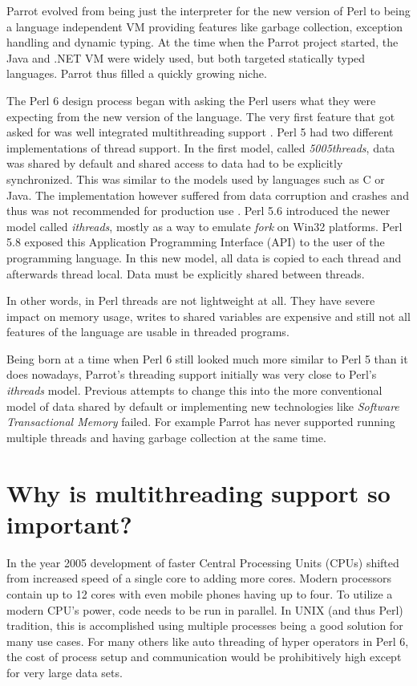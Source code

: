\documentclass[bachelor,english]{hgbthesis}
\begin{document}
Parrot evolved from being just the interpreter for the new version of Perl to being a language independent VM providing features like garbage collection, exception handling and dynamic typing. At the time when the Parrot project started, the Java and .NET VM were widely used, but both targeted statically typed languages. Parrot thus filled a quickly growing niche.

The Perl 6 design process began with asking the Perl users what they were expecting from the new version of the language. The very first feature that got asked for was well integrated multithreading support \cite{RFC1}. Perl 5 had two different implementations of thread support. In the first model, called \textit{5005threads}, data was shared by default and shared access to data had to be explicitly synchronized. This was similar to the models used by languages such as C or Java. The implementation however suffered from data corruption and crashes and thus was not recommended for production use \cite{ThreadManual}. Perl 5.6 introduced the newer model called \textit{ithreads}, mostly as a way to emulate \textit{fork} on Win32 platforms. Perl 5.8 exposed this Application Programming Interface (API) to the user of the programming language. In this new model, all data is copied to each thread and afterwards thread local. Data must be explicitly shared between threads.

In other words, in Perl threads are not lightweight at all. They have severe impact on memory usage, writes to shared variables are expensive and still not all features of the language are usable in threaded programs.

Being born at a time when Perl 6 still looked much more similar to Perl 5 than it does nowadays, Parrot's threading support initially was very close to Perl's \textit{ithreads} model. Previous attempts to change this into the more conventional model of data shared by default or implementing new technologies like \textit{Software Transactional Memory} failed. For example Parrot has never supported running multiple threads and having garbage collection at the same time.

\section{Why is multithreading support so important?}

In the year 2005 development of faster Central Processing Units (CPUs) shifted from increased speed of a single core to adding more cores. Modern processors contain up to 12 cores with even mobile phones having up to four. To utilize a modern CPU's power, code needs to be run in parallel. In UNIX (and thus Perl) tradition, this is accomplished using multiple processes being a good solution for many use cases. For many others like auto threading of hyper operators in Perl 6, the cost of process setup and communication would be prohibitively high except for very large data sets.
\end{document}
